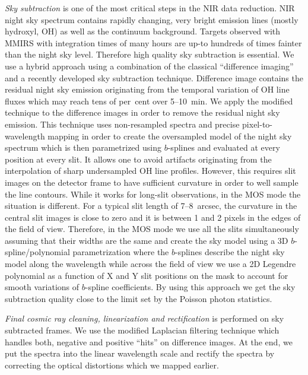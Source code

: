  \emph{Sky subtraction} is one of the most critical steps in the NIR data reduction.  NIR night sky spectrum contains rapidly changing, very bright emission lines (mostly hydroxyl, OH) as well as the continuum background. Targets observed with MMIRS with integration times of many hours are up-to hundreds of times fainter than the night sky level.  Therefore high quality sky subtraction is essential.  We use a hybrid approach using a combination of the classical ``difference imaging'' and a recently developed sky subtraction technique.  Difference image contains the residual night sky emission originating from the temporal variation of OH line fluxes which may reach tens of per~cent over 5--10~min.  We apply the modified \citet{Kelson03} technique to the difference images in order to remove the residual night sky emission.  This technique uses non-resampled spectra and precise pixel-to-wavelength mapping in order to create the oversampled model of the night sky spectrum which is then parametrized using $b$-splines and evaluated at every position at every slit.  It allows one to avoid artifacts originating from the interpolation of sharp undersampled OH line profiles. However, this requires slit images on the detector frame to have sufficient curvature in order to well sample the line contours.  While it works for long-slit observations, in the MOS mode the situation is different.  For a typical slit length of 7--8~arcsec, the curvature in the central slit images is close to zero and it is between 1 and 2 pixels in the edges of the field of view.  Therefore, in the MOS mode we use all the slits simultaneously assuming that their widths are the same and create the sky model using a 3D $b$-spline/polynomial parametrization where the $b$-splines describe the night sky model along the wavelength while across the field of view we use a 2D Legendre polynomial as a function of X and Y slit positions on the mask to account for smooth variations of $b$-spline coefficients.  By using this approach we get the sky subtraction quality close to the limit set by the Poisson photon statistics.

\emph{Final cosmic ray cleaning, linearization and rectification} is performed on sky subtracted frames.  We use the modified Laplacian filtering technique \citep{vanDokkum01} which handles both, negative and positive ``hits'' on difference images.  At the end, we put the spectra into the linear wavelength scale and rectify the spectra by correcting the optical distortions which we mapped earlier.

